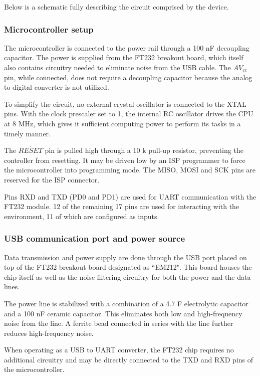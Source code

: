 \documentclass{article}
\begin{document}
	Below is a schematic fully describing the circuit comprised by the device.
	
	\subsubsection{Microcontroller setup}
	
	The microcontroller is connected to the power rail through a 100 nF
	decoupling capacitor. The power is supplied from the FT232 breakout board,
	which itself also contains circuitry needed to eliminate noise from the
	USB cable. The $AV_{cc}$ pin, while connected, does not require a
	decoupling capacitor because the analog to digital converter is not
	utilized.
	
	To simplify the circuit, no external crystal oscillator is connected to the
	XTAL pins. With the clock prescaler set to 1, the internal RC oscillator
	drives the CPU at 8 MHz, which gives it sufficient computing power to
	perform its tasks in a timely manner.
	
	The $\overline{RESET}$ pin is pulled high through a 10 k\textOmega {}
	pull-up resistor, preventing the controller from resetting. It may be
	driven low by an ISP programmer to force the microcontroller into
	programming mode. The MISO, MOSI and SCK pins are reserved for the ISP
	connector.
	
	Pins RXD and TXD (PD0 and PD1) are used for UART communication with the
	FT232 module. 12 of the remaining 17 pins are used for interacting with the
	environment, 11 of which are configured as inputs.
	
	
	
	\subsubsection{USB communication port and power source}
	
	Data transmission and power supply are done through the USB port placed on
	top of the FT232 breakout board designated as ``EM212". This board houses
	the chip itself as well as the noise filtering circuitry for both the power
	and the data lines.
	
	The power line is stabilized with a combination of a 4.7 \textmu F
	electrolytic capacitor and a 100 nF ceramic capacitor. This eliminates both
	low and high-frequency noise from the line. A ferrite bead connected in
	series with the line further reduces high-frequency noise.
	
	When operating as a USB to UART converter, the FT232 chip requires no
	additional circuitry and may be directly connected to the TXD and RXD pins
	of the microcontroller.
	
\end{document}
